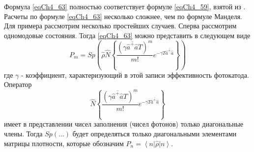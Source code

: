 Формула \eqref{eqCh4_63} полностью соответствует формуле
\eqref{eqCh4_59}, взятой из \cite{bLoudon1976}. Расчеты по
формуле \eqref{eqCh4_63} несколько 
сложнее, чем по формуле Манделя. Для примера рассмотрим несколько
простейших случаев. Сперва рассмотрим одномодовые состояния. Тогда
\eqref{eqCh4_63} можно представить в следующем виде 
\[
P_m = Sp\left(
\hat{\rho}
\hat{N}
\left\{
\frac{\left(\gamma \overline{\hat{a}^{+} \hat{a}} T\right)^m}{m!}
e^{- \gamma T \overline{\hat{a}^{+} \hat{a}}}
\right\}
\right)
\]
где $\gamma$ - коэффициент, характеризующий в этой записи
эффективность фотокатода. Оператор 
\[
\hat{N}
\left\{
\frac{\left(\gamma \overline{\hat{a}^{+} \hat{a}} T\right)^m}{m!}
e^{- \gamma T \overline{\hat{a}^{+} \hat{a}}}
\right\}
\]
имеет в представлении чисел заполнения (чисел фотонов) только
диагональные члены. Тогда $Sp\left(\dots\right)$ будет определяться
только диагональными элементами матрицы плотности, 
которые обозначим $P_n = \left<n\right|\hat{\rho}\left|n\right>$.

